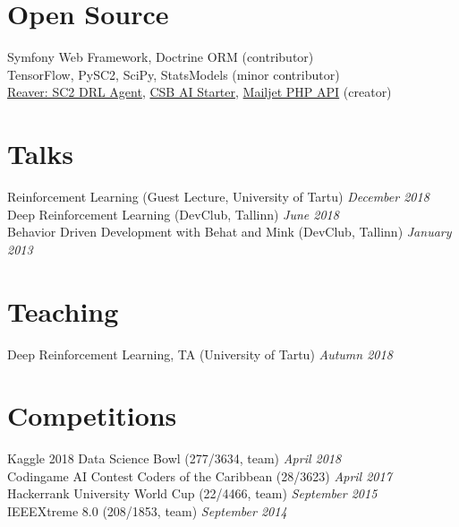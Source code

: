 \documentclass[margin,line]{res}
\begin{document}
\begin{resume}
\section{\sc Open Source}
Symfony Web Framework, Doctrine ORM (contributor)\vspace*{+.05in}\\
TensorFlow, PySC2, SciPy, StatsModels (minor contributor)\vspace*{+.05in}\\
\href{https://github.com/Inoryy/reaver-pysc2}{Reaver: SC2 DRL Agent}, \href{https://github.com/Inoryy/csb-ai-starter}{CSB AI Starter}, \href{https://github.com/KnpLabs/mailjet-api-php}{Mailjet PHP API} (creator)

\section{\sc Talks}
Reinforcement Learning (Guest Lecture, University of Tartu) \hfill {\it December 2018}\vspace*{+.05in}\\
Deep Reinforcement Learning (DevClub, Tallinn) \hfill {\it June 2018}\vspace*{+.05in}\\
Behavior Driven Development with Behat and Mink (DevClub, Tallinn) \hfill {\it January 2013}

\section{\sc Teaching}
Deep Reinforcement Learning, TA (University of Tartu) \hfill {\it Autumn 2018}

\section{\sc Competitions}
Kaggle 2018 Data Science Bowl (277/3634, team) \hfill {\it April 2018}\vspace*{+.05in}\\
Codingame AI Contest Coders of the Caribbean (28/3623) \hfill {\it April 2017}\vspace*{+.05in}\\
Hackerrank University World Cup (22/4466, team) \hfill {\it September 2015}\vspace*{+.05in}\\
IEEEXtreme 8.0 (208/1853, team) \hfill {\it September 2014}


\end{resume}
\end{document}
